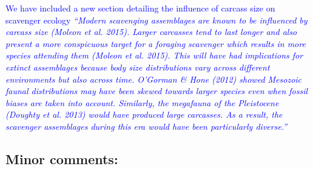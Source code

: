 \documentclass[12pt,letterpaper]{article}
\begin{document}
\begin{enumerate}
\textcolor{blue}{We have included a new section detailing the influence of carcass size on scavenger ecology \textit{``Modern scavenging assemblages are known to be influenced by carcass size (Moleon et al. 2015). 
Larger carcasses tend to last longer and also present a more conspicuous target for a foraging scavenger which results in more species attending them (Moleon et al. 2015).
This will have had implications for extinct assemblages because body size distributions vary across different environments but also across time. 
O'Gorman \& Hone (2012) showed Mesozoic faunal distributions may have been skewed towards larger species even when fossil biases are taken into account. 
Similarly, the megafauna of the Pleistocene (Doughty et al. 2013) would have produced large carcasses. 
As a result, the scavenger assemblages during this era would have been particularly diverse.''}}

\end{enumerate}

\subsection{Minor comments:}
\end{document}
